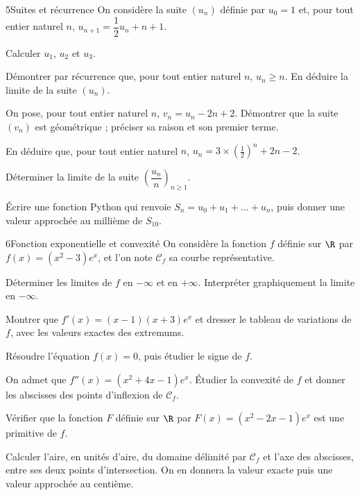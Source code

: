 \begin{exoBac}{5}{Suites et récurrence}
On considère la suite $(u_n)$ définie par $u_0=1$ et, pour tout entier naturel $n$, $u_{n+1}=\dfrac12u_n+n+1$.
\begin{questions}
  \item Calculer $u_1$, $u_2$ et $u_3$.
  \item Démontrer par récurrence que, pour tout entier naturel $n$, $u_n\geq n$. En déduire la limite de la suite $(u_n)$.
  \item On pose, pour tout entier naturel $n$, $v_n=u_n-2n+2$. Démontrer que la suite $(v_n)$ est géométrique ; préciser sa raison et
    son premier terme.
  \item En déduire que, pour tout entier naturel $n$, $u_n=3\times\left(\frac12\right)^{n}+2n-2$.
  \item Déterminer la limite de la suite $\left(\dfrac{u_n}{n}\right)_{n\geq1}$.
  \item Écrire une fonction Python  qui renvoie $S_n=u_0+u_1+\dots+u_n$, puis donner une valeur approchée au millième de
    $S_{10}$.
\end{questions}
\end{exoBac}

\begin{exoBac}{6}{Fonction exponentielle et convexité}
On considère la fonction $f$ définie sur $\R$ par $f(x)=\left(x^{2}-3\right)e^{x}$, et l'on note $\mathcal{C}_f$ sa courbe représentative.
\begin{questions}
  \item Déterminer les limites de $f$ en $-\infty$ et en $+\infty$. Interpréter graphiquement la limite en $-\infty$.
  \item Montrer que $f'(x)=(x-1)(x+3)e^{x}$ et dresser le tableau de variations de $f$, avec les valeurs exactes des extremums.
  \item Résoudre l'équation $f(x)=0$, puis étudier le signe de $f$.
\end{questions}
\begin{questions}[resume]
  \item On admet que $f''(x)=\left(x^{2}+4x-1\right)e^{x}$. Étudier la convexité de $f$ et donner les abscisses des points d'inflexion de
    $\mathcal{C}_f$.
  \item Vérifier que la fonction $F$ définie sur $\R$ par $F(x)=\left(x^{2}-2x-1\right)e^{x}$ est une primitive de $f$.
  \item Calculer l'aire, en unités d'aire, du domaine délimité par $\mathcal{C}_f$ et l'axe des abscisses, entre ses deux points
    d'intersection. On en donnera la valeur exacte puis une valeur approchée au centième.
\end{questions}
\end{exoBac}


